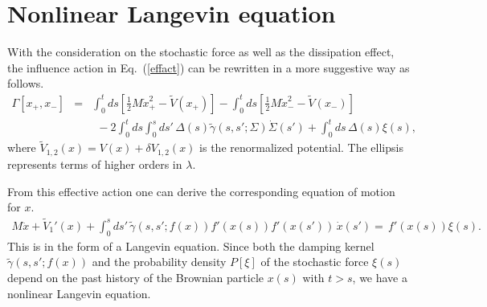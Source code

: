 \documentclass[%
amssymb,preprint,preprintnumbers,nofootinbib,superscriptaddress]{revtex4}
\begin{document}

%
%

\section{Nonlinear Langevin equation}\label{sec:FDR}

With the consideration on the stochastic force as well as the dissipation effect, the influence action in Eq.~(\ref{effact}) can be rewritten in a more suggestive way as follows.
\begin{eqnarray}
\Gamma[x_{+},x_{-}]&=&\int_{0}^{t}ds\left[\frac{1}{2}M\dot{x}_{+}^{2}-\tilde{V}(x_{+})\right]
-\int_{0}^{t}ds\left[\frac{1}{2}M\dot{x}_{-}^{2}-\tilde{V}(x_{-})\right]\nonumber\\
&&\ \ -2\int_{0}^{t}ds\int_{0}^{s}ds'\, \Delta(s)\tilde{\gamma}(s,s';\Sigma)\dot{\Sigma}(s')
+\int_{0}^{t}ds\, \Delta(s)\xi(s),
\end{eqnarray}
where $\tilde{V}_{1,2}(x)=V(x)+\delta V_{1,2}(x)$ is the renormalized potential. The ellipsis represents terms of higher orders in $\lambda$. 

From this effective action one can derive the corresponding equation of motion for $x$.
\begin{eqnarray}
M\ddot{x}+\tilde{V}_{1}'(x)+\int_{0}^{s}ds'\, \tilde{\gamma}(s,s';f(x))f'(x(s))f'(x(s'))\,\dot{x}(s')=\,f'(x(s))\xi(s).\label{LanEq1}
\end{eqnarray}
This is in the form of a Langevin equation. Since both the damping kernel $\tilde{\gamma}(s,s';f(x))$ and the probability density $P[\xi]$ of the stochastic force $\xi(s)$ depend on the past history of the Brownian particle $x(s)$ with $t>s$, we have a nonlinear Langevin equation.
\end{document}

